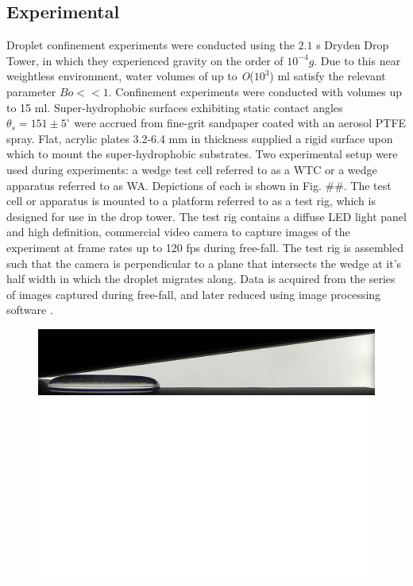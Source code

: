 \documentclass{article}
\begin{document}
\subsection*{Experimental}
Droplet confinement experiments were conducted using the $2.1$ s Dryden Drop Tower,  in which they experienced gravity on the order of  $10^{-4} g$. Due to this near weightless environment, water volumes of up to \textit{O}($10^3$) ml satisfy the relevant parameter $Bo << 1$. Confinement experiments were conducted with volumes up to 15 ml. Super-hydrophobic surfaces exhibiting static contact angles $\theta_{s} = 151 \pm 5^{\circ}$ were accrued from fine-grit sandpaper coated with an aerosol PTFE spray. Flat, acrylic plates 3.2-6.4 mm in thickness supplied a rigid surface upon which to mount the super-hydrophobic substrates. Two experimental setup were used during experiments: a wedge test cell referred to as a WTC or a wedge apparatus referred to as WA. Depictions of each is shown in Fig. \#\#. The test cell or apparatus is mounted to a platform referred to as a test rig, which is designed for use in the drop tower. The test rig contains a diffuse LED light panel and high definition, commercial video camera \cite{Camera} to capture images of the experiment at frame rates up to 120 fps during free-fall. The test rig is assembled such that the camera is perpendicular to a plane that intersects the wedge at it's half width in which the droplet migrates along. Data is acquired from the series of images captured during free-fall, and later reduced using image processing software \cite{Software2004}.

\begin{figure}
	\centering
	\includegraphics[scale=0.4]{Figures/initialcondition}
	\includegraphics[scale=0.5]{Figures/Schematic2}
	\caption{}
	\label{fig:initial}
\end{figure}
\end{document}

